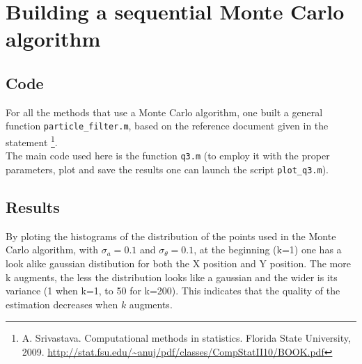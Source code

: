 \documentclass[english,DIV=13]{scrreprt}
\begin{document}
\chapter{Building a sequential Monte Carlo algorithm}
\section*{Code}
For all the methods that use a Monte Carlo algorithm, one built a general function 
\texttt{particle\_filter.m}, based on the reference document given in the statement
\footnote{A. Srivastava. Computational methods in statistics. Florida State University, 2009.
\url{http://stat.fsu.edu/~anuj/pdf/classes/CompStatII10/BOOK.pdf}}.\\

The main code used here is the function \texttt{q3.m} (to employ it with the proper
parameters, plot and save the results one can launch the script \texttt{plot\_q3.m}).
\newpage

\section*{Results}
By ploting the histograms of the distribution of the points used in the Monte Carlo algorithm, 
with $\sigma_a=0.1$ and $\sigma_{\theta}=0.1$, at the beginning (k=1) one has a look alike gaussian
distibution for both the X position and Y position. The more k augments, the less the
distribution looks like a gaussian and the wider is its variance (1 when k=1, to 50 for k=200).
This indicates that the quality of the estimation decreases when $k$ augments.
\end{document}
